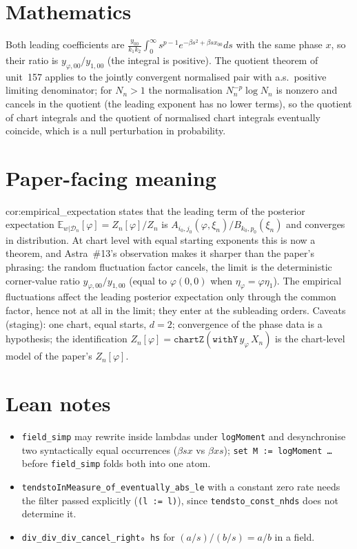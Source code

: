 \documentclass[11pt]{article}
\begin{document}
\section{Mathematics}
Both leading coefficients are $\frac{y_{00}}{k_1k_2}\int_0^\infty s^{p-1}e^{-\beta s^2+\beta sx_{00}}ds$
with the same phase $x$, so their ratio is $y_{\varphi,00}/y_{1,00}$ (the integral is positive). The
quotient theorem of unit~157 applies to the jointly convergent normalised pair with a.s.\ positive
limiting denominator; for $N_n>1$ the normalisation $N_n^{-p}\log N_n$ is nonzero and cancels in the
quotient (the leading exponent has no lower terms), so the quotient of chart integrals and the
quotient of normalised chart integrals eventually coincide, which is a null perturbation in probability.

\section{Paper-facing meaning}
cor:empirical\_expectation states that the leading term of the posterior expectation
$\mathbb E_{w|\mathcal D_n}[\varphi]=Z_n[\varphi]/Z_n$ is $A_{i_0,j_0}(\varphi,\xi_n)/B_{k_0,p_0}(\xi_n)$
and converges in distribution. At chart level with equal starting exponents this is now a theorem,
and Astra~\#13's observation makes it sharper than the paper's phrasing: the random fluctuation
factor cancels, the limit is the deterministic corner-value ratio $y_{\varphi,00}/y_{1,00}$ (equal to
$\varphi(0,0)$ when $\eta_\varphi=\varphi\eta_1$). The empirical fluctuations affect the leading
posterior expectation only through the common factor, hence not at all in the limit; they enter at
the subleading orders. Caveats (staging): one chart, equal starts, $d=2$; convergence of the phase
data is a hypothesis; the identification $Z_n[\varphi]=\texttt{chartZ}(\texttt{withY}\,y_\varphi\,X_n)$
is the chart-level model of the paper's $Z_n[\varphi]$.

\section{Lean notes}
\begin{itemize}
\item \texttt{field\_simp} may rewrite inside lambdas under \texttt{logMoment} and desynchronise two
syntactically equal occurrences ($\beta s x$ vs $\beta x s$); \texttt{set M := logMoment …} before
\texttt{field\_simp} folds both into one atom.
\item \texttt{tendstoInMeasure\_of\_eventually\_abs\_le} with a constant zero rate needs the filter
passed explicitly (\texttt{(l := l)}), since \texttt{tendsto\_const\_nhds} does not determine it.
\item \texttt{div\_div\_div\_cancel\_right₀ hs} for $(a/s)/(b/s)=a/b$ in a field.
\end{itemize}
\end{document}
